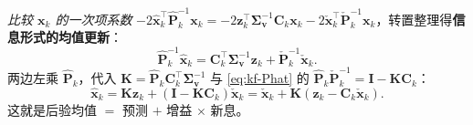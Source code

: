 \emph{比较 $\mathbf{x}_k$ 的一次项系数} $-2\hat{\mathbf{x}}_k^\top\hat{\mathbf{P}}_k^{-1}\mathbf{x}_k=-2\mathbf{z}_k^\top\boldsymbol{\Sigma}_{\mathbf{v}}^{-1}\mathbf{C}_k\mathbf{x}_k-2\check{\mathbf{x}}_k^\top\check{\mathbf{P}}_k^{-1}\mathbf{x}_k$，转置整理得\textbf{信息形式的均值更新}：
\begin{equation}
  \hat{\mathbf{P}}_k^{-1}\hat{\mathbf{x}}_k=\mathbf{C}_k^\top\boldsymbol{\Sigma}_{\mathbf{v}}^{-1}\mathbf{z}_k+\check{\mathbf{P}}_k^{-1}\check{\mathbf{x}}_k.
  \label{eq:kf-info-x}
\end{equation}
两边左乘 $\hat{\mathbf{P}}_k$，代入 $\mathbf{K}=\hat{\mathbf{P}}_k\mathbf{C}_k^\top\boldsymbol{\Sigma}_{\mathbf{v}}^{-1}$ 与 \cref{eq:kf-Phat} 的 $\hat{\mathbf{P}}_k\check{\mathbf{P}}_k^{-1}=\mathbf{I}-\mathbf{K}\mathbf{C}_k$：
\begin{equation}
  \hat{\mathbf{x}}_k=\mathbf{K}\mathbf{z}_k+(\mathbf{I}-\mathbf{K}\mathbf{C}_k)\check{\mathbf{x}}_k=\check{\mathbf{x}}_k+\mathbf{K}(\mathbf{z}_k-\mathbf{C}_k\check{\mathbf{x}}_k).
  \label{eq:kf-xhat}
\end{equation}
这就是后验均值 $=$ 预测 $+$ 增益 $\times$ 新息。

